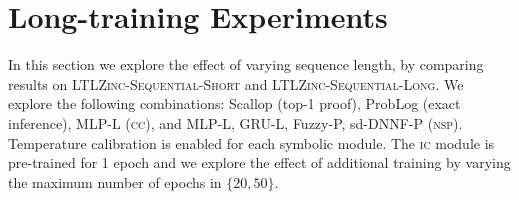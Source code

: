 %
%


\section{Long-training Experiments}
In this section we explore the effect of varying sequence length, by comparing results on \textsc{LTLZinc-Sequential-Short} and \textsc{LTLZinc-Sequential-Long}. We explore the following combinations: Scallop (top-1 proof), ProbLog (exact inference), MLP-L (\textsc{cc}), and MLP-L, GRU-L, Fuzzy-P, sd-DNNF-P (\textsc{nsp}).
Temperature calibration is enabled for each symbolic module.
The \textsc{ic} module is pre-trained for 1 epoch and we explore the effect of additional training by varying the maximum number of epochs in $\{20, 50\}$.

